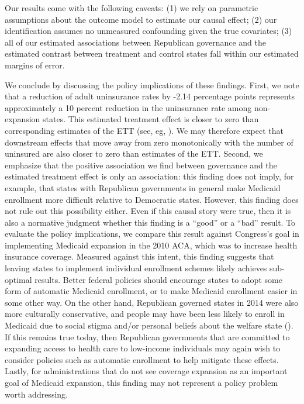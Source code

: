 \documentclass[12pt]{article}
\begin{document}
Our results come with the following caveats: (1) we rely on parametric assumptions about the outcome model to estimate our causal effect; (2) our identification assumes no unmeasured confounding given the true covariates; (3) all of our estimated associations between Republican governance and the estimated contrast between treatment and control states fall within our estimated margins of error. 

We conclude by discussing the policy implications of these findings. First, we note that a reduction of adult uninsurance rates by -2.14 percentage points represents approximately a 10 percent reduction in the uninsurance rate among non-expansion states. This estimated treatment effect is closer to zero than corresponding estimates of the ETT (see, eg, \cite{courtemanche2017early}). We may therefore expect that downstream effects that move away from zero monotonically with the number of uninsured are also closer to zero than estimates of the ETT. Second, we emphasize that the positive association we find between governance and the estimated treatment effect is only an association: this finding does not imply, for example, that states with Republican governments in general make Medicaid enrollment more difficult relative to Democratic states. However, this finding does not rule out this possibility either. Even if this causal story were true, then it is also a normative judgment whether this finding is a ``good'' or a ``bad'' result. To evaluate the policy implications, we compare this result against Congress's goal in implementing Medicaid expansion in the 2010 ACA, which was to increase health insurance coverage. Measured against this intent, this finding suggests that leaving states to implement individual enrollment schemes likely achieves sub-optimal results. Better federal policies should encourage states to adopt some form of automatic Medicaid enrollment, or to make Medicaid enrollment easier in some other way. On the other hand, Republican governed states in 2014 were also more culturally conservative, and people may have been less likely to enroll in Medicaid due to social stigma and/or personal beliefs about the welfare state (\cite{sommers2012understanding}). If this remains true today, then Republican governments that are committed to expanding access to health care to low-income individuals may again wish to consider policies such as automatic enrollment to help mitigate these effects. Lastly, for administrations that do not see coverage expansion as an important goal of Medicaid expansion, this finding may not represent a policy problem worth addressing.
\end{document}
